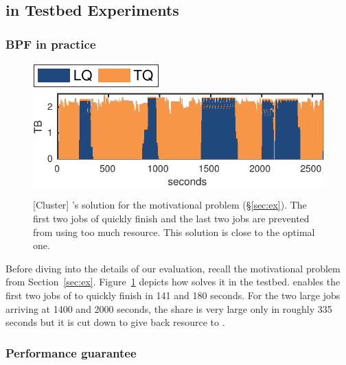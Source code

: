 \subsection{\name in Testbed Experiments}
\label{sec:testbed}

\subsubsection{BPF in practice}

\begin{figure}[!t]
    \centering
    \includegraphics[width=0.3\linewidth]{fig/b1_mov_legend} 
    \\
    \includegraphics[width=0.8\linewidth]{fig/b1_mov_SpeedFair_BB} 
    \caption{[Cluster] \name's solution for the motivational problem (\S\ref{sec:ex}). The first two jobs of {\burstq} quickly finish and the last two jobs are prevented from using too much resource. This solution is close to the optimal one.}
    \label{fig:solution}
\end{figure}

Before diving into the details of our evaluation, recall the motivational problem from Section~\ref{sec:ex}. 
Figure~\ref{fig:solution} depicts how \name solves it in the testbed. \name enables the first two jobs of {\burstq} to quickly finish in 141 and 180 seconds.
For the two large jobs arriving at 1400 and 2000 seconds, the share is very large only in roughly 335 seconds but it is cut down to give back resource to {\batchq}.

\subsubsection{Performance guarantee}
\label{sec:performane_guarantee}

